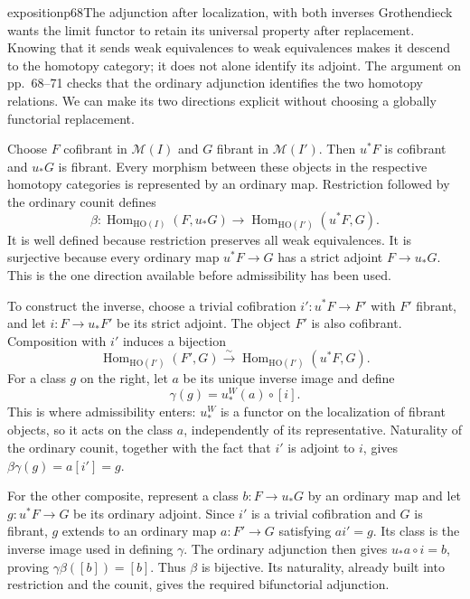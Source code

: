 \begin{dcomment}{exposition}{p68}{The adjunction after localization, with both inverses}
Grothendieck wants the limit functor to retain its universal property after replacement. Knowing that it sends weak equivalences to weak equivalences makes it descend to the homotopy category; it does not alone identify its adjoint. The argument on pp.~68--71 checks that the ordinary adjunction identifies the two homotopy relations. We can make its two directions explicit without choosing a globally functorial replacement.

Choose $F$ cofibrant in $\mathcal M(I)$ and $G$ fibrant in $\mathcal M(I')$. Then $u^*F$ is cofibrant and $u_*G$ is fibrant. Every morphism between these objects in the respective homotopy categories is represented by an ordinary map. Restriction followed by the ordinary counit defines
\[
 \beta:\operatorname{Hom}_{\mathrm{HO}(I)}(F,u_*G)
 \longrightarrow\operatorname{Hom}_{\mathrm{HO}(I')}(u^*F,G).
\]
It is well defined because restriction preserves all weak equivalences. It is surjective because every ordinary map $u^*F\to G$ has a strict adjoint $F\to u_*G$. This is the one direction available before admissibility has been used.

To construct the inverse, choose a trivial cofibration $i':u^*F\to F'$ with $F'$ fibrant, and let $i:F\to u_*F'$ be its strict adjoint. The object $F'$ is also cofibrant. Composition with $i'$ induces a bijection
\[
 \operatorname{Hom}_{\mathrm{HO}(I')}(F',G)
    \xrightarrow{\sim}\operatorname{Hom}_{\mathrm{HO}(I')}(u^*F,G).
\]
For a class $g$ on the right, let $a$ be its unique inverse image and define
\[
                            \gamma(g)=u_*^W(a)\circ[i].
\]
This is where admissibility enters: $u_*^W$ is a functor on the localization of fibrant objects, so it acts on the class $a$, independently of its representative. Naturality of the ordinary counit, together with the fact that $i'$ is adjoint to $i$, gives $\beta\gamma(g)=a[i']=g$.

For the other composite, represent a class $b:F\to u_*G$ by an ordinary map and let $g:u^*F\to G$ be its ordinary adjoint. Since $i'$ is a trivial cofibration and $G$ is fibrant, $g$ extends to an ordinary map $a:F'\to G$ satisfying $ai'=g$. Its class is the inverse image used in defining $\gamma$. The ordinary adjunction then gives $u_*a\circ i=b$, proving $\gamma\beta([b])=[b]$. Thus $\beta$ is bijective. Its naturality, already built into restriction and the counit, gives the required bifunctorial adjunction.


\end{dcomment}
